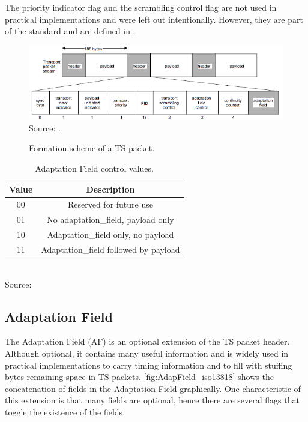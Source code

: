 \documentclass[12pt,a4paper]{article}
\begin{document}
The priority indicator flag and the scrambling control flag are not used in practical implementations and were left out intentionally. However, they are part of the standard and are defined in .
 
\begin{figure}[!h]
\centering
\caption{Formation scheme of a TS packet.}
\includegraphics[width=1\linewidth]{pictures/TS_iso13818.png}
\\Source: .
\label{fig:TS_iso13818}
\end{figure}

\begin{table}[!h]
\caption{Adaptation Field control values.}
\begin{center}
\begin{tabular}{|c|c|}
\hline
Value & Description \\
\hline
00 & Reserved for future use\\
\hline
01 & No adaptation\hspace{0.1mm}\_\hspace{0.1mm}field, payload only\\
\hline
10 & Adaptation\hspace{0.1mm}\_\hspace{0.1mm}field only, no payload\\
\hline
11 & Adaptation\hspace{0.1mm}\_\hspace{0.1mm}field followed by payload\\
\hline
\end{tabular}
\label{tab_adapataion_field}
\\Source: 
\end{center}
\end{table}

\subsection{Adaptation Field}

The Adaptation Field (AF) is an optional extension of the TS packet header. Although optional, it contains many useful information and is widely used in practical implementations to carry timing information and to fill with stuffing bytes remaining space in TS packets. \autoref{fig:AdapField_iso13818} shows the concatenation of fields in the Adaptation Field graphically. One characteristic of this extension is that many fields are optional, hence there are several flags that toggle the existence of the fields.
\end{document}
